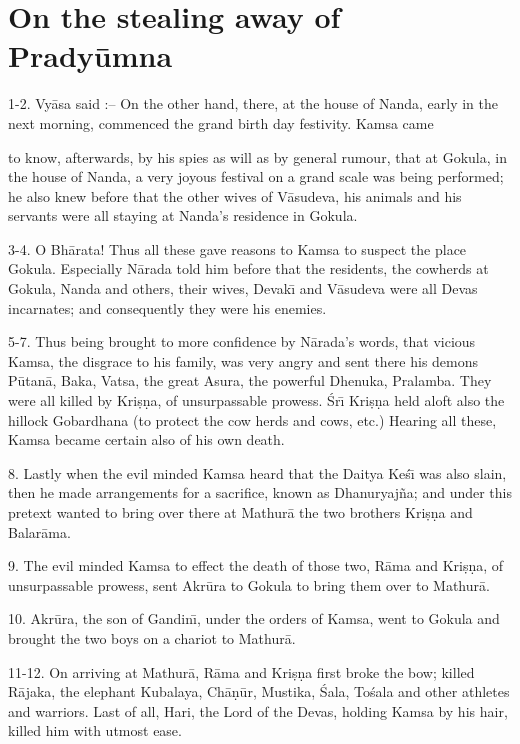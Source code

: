 \chapter{On the stealing away of Prady\=umna}

1-2. Vy\=asa said :-- On the other hand, there, at the house of Nanda, early in the next morning, commenced the grand birth day festivity. Kamsa came

to know, afterwards, by his spies as will as by general rumour, that at Gokula, in the house of Nanda, a very joyous festival on a grand scale was being performed; he also knew before that the other wives of V\=asudeva, his animals and his servants were all staying at Nanda's residence in Gokula.

3-4. O Bh\=arata! Thus all these gave reasons to Kamsa to suspect the place Gokula. Especially N\=arada told him before that the residents, the cowherds at Gokula, Nanda and others, their wives, Devak\={\i} and V\=asudeva were all Devas incarnates; and consequently they were his enemies.

5-7. Thus being brought to more confidence by N\=arada's words, that vicious Kamsa, the disgrace to his family, was very angry and sent there his demons P\=utan\=a, Baka, Vatsa, the great Asura, the powerful Dhenuka, Pralamba. They were all killed by Kri\d{s}\d{n}a, of unsurpassable prowess. \'Sr\={\i} Kri\d{s}\d{n}a held aloft also the hillock Gobardhana (to protect the cow herds and cows, etc.) Hearing all these, Kamsa became certain also of his own death.

8. Lastly when the evil minded Kamsa heard that the Daitya Ke\'s\={\i} was also slain, then he made arrangements for a sacrifice, known as Dhanuryaj\~na; and under this pretext wanted to bring over there at Mathur\=a the two brothers Kri\d{s}\d{n}a and Balar\=ama.

9. The evil minded Kamsa to effect the death of those two, R\=ama and Kri\d{s}\d{n}a, of unsurpassable prowess, sent Akr\=ura to Gokula to bring them over to Mathur\=a.

10. Akr\=ura, the son of Gandin\={\i}, under the orders of Kamsa, went to Gokula and brought the two boys on a chariot to Mathur\=a.

11-12. On arriving at Mathur\=a, R\=ama and Kri\d{s}\d{n}a first broke the bow; killed R\=ajaka, the elephant Kubalaya, Ch\=a\d{n}\=ur, Mustika, \'Sala, To\'sala and other athletes and warriors. Last of all, Hari, the Lord of the Devas, holding Kamsa by his hair, killed him with utmost ease.


